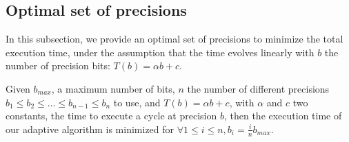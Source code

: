 \subsection{Optimal set of precisions}

In this subsection, we provide an optimal set of precisions to minimize the
total execution time, under the assumption that the time evolves linearly with
$b$ the number of precision bits: $T(b) = \alpha b + c$. 

   \begin{theorem}

       Given $b_{max}$, a maximum number of bits, $n$ the number of different
       precisions $b_1 \leq b_2 \leq \dots \leq b_{n-1} \leq b_n$ to use, and $T(b)=\alpha b+c$, with $\alpha$
       and $c$ two constants, the time to execute a cycle at precision $b$,
       then the execution time of our adaptive algorithm is minimized for $\forall 1\leq i\leq n, b_i
       = \frac{i}{n}b_{max}$.

   \end{theorem}

